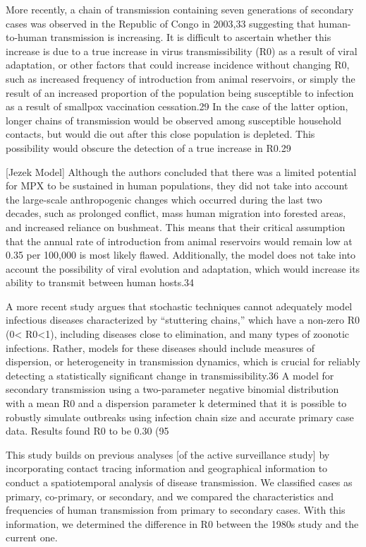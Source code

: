 More recently, a chain of transmission containing seven generations of secondary cases was observed in the Republic of Congo in 2003,33 suggesting that human-to-human transmission is increasing. It is difficult to ascertain whether this increase is due to a true increase in virus transmissibility (R0) as a result of viral adaptation, or other factors that could increase incidence without changing R0, such as increased frequency of introduction from animal reservoirs, or simply the result of an increased proportion of the population being susceptible to infection as a result of smallpox vaccination cessation.29 In the case of the latter option, longer chains of transmission would be observed among susceptible household contacts, but would die out after this close population is depleted. This possibility would obscure the detection of a true increase in R0.29

[Jezek Model] Although the authors concluded that there was a limited potential for MPX to be sustained in human populations, they did not take into account the large-scale anthropogenic changes which occurred during the last two decades, such as prolonged conflict, mass human migration into forested areas, and increased reliance on bushmeat. This means that their critical assumption that the annual rate of introduction from animal reservoirs would remain low at 0.35 per 100,000 is most likely flawed. Additionally, the model does not take into account the possibility of viral evolution and adaptation, which would increase its ability to transmit between human hosts.34

A more recent study argues that stochastic techniques cannot adequately model infectious diseases characterized by “stuttering chains,” which have a non-zero R0 (0< R0<1), including diseases close to elimination, and many types of zoonotic infections. Rather, models for these diseases should include measures of dispersion, or heterogeneity in transmission dynamics, which is crucial for reliably detecting a statistically significant change in transmissibility.36 A model for secondary transmission using a two-parameter negative binomial distribution with a mean R0 and a dispersion parameter k determined that it is possible to robustly simulate outbreaks using infection chain size and accurate primary case data. Results found R0 to be 0.30 (95%

This study builds on previous analyses [of the active surveillance study] by incorporating contact tracing information and geographical information to conduct a spatiotemporal analysis of disease transmission. We classified cases as primary, co-primary, or secondary, and we compared the characteristics and frequencies of human transmission from primary to secondary cases. With this information, we determined the difference in R0 between the 1980s study and the current one. 

